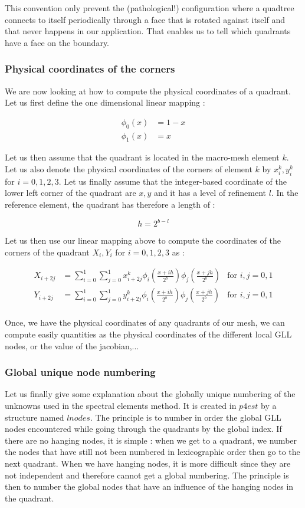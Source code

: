 This convention only prevent the (pathological!) configuration where a quadtree connects to itself periodically through a face that is rotated against itself and that never happens in our application. That enables us to tell which quadrants have a face on the boundary. 

\subsubsection{Physical coordinates of the corners}

We are now looking at how to compute the physical coordinates of a quadrant. Let us first define the one dimensional linear mapping : 

\begin{align*}
\phi_0(x) &= 1-x\\
\phi_1(x) &= x
\end{align*}

Let us then assume that the quadrant is located in the macro-mesh element $k$. Let us also denote the physical coordinates of the corners of element $k$ by $x^k_i,y^k_i$ for $i=0,1,2,3$. Let us finally assume that the integer-based coordinate of the lower left corner of the quadrant are $x,y$ and it has a level of refinement $l$. In the reference element, the quadrant has therefore a length of :

$$ h = 2^{b-l} $$ 

Let us then use our linear mapping above to compute the coordinates of the corners of the quadrant $X_i,Y_i$ for $i=0,1,2,3$ as : 

\begin{align*}
X_{i+2j} &= \sum_{i=0}^1\sum_{j=0}^1 x^k_{i+2j} \phi_i(\frac{x+ih}{2^b})\phi_j(\frac{x+jh}{2^b}) &\text{for $i,j=0,1$}\\ 
Y_{i+2j} &= \sum_{i=0}^1\sum_{j=0}^1 y^k_{i+2j} \phi_i(\frac{x+ih}{2^b})\phi_j(\frac{x+jh}{2^b}) &\text{for $i,j=0,1$}\\ 
\end{align*}


Once, we have the physical coordinates of any quadrants of our mesh, we can compute easily quantities as the physical coordinates of the different local GLL nodes, or the value of the jacobian,...

\subsubsection{Global unique node numbering}

Let us finally give some explanation about the globally unique numbering of the unknowns used in the spectral elements method. It is created in $p4est$ by a structure named $lnodes$. The principle is to number in order the global GLL nodes encountered while going through the quadrants by the global index. If there are no hanging nodes, it is simple : when we get to a quadrant, we number the nodes that have still not been numbered in lexicographic order then go to the next quadrant. When we have hanging nodes, it is more difficult since they are not independent and therefore cannot get a global numbering. The principle is then to number the global nodes that have an influence of the hanging nodes in the quadrant. 

